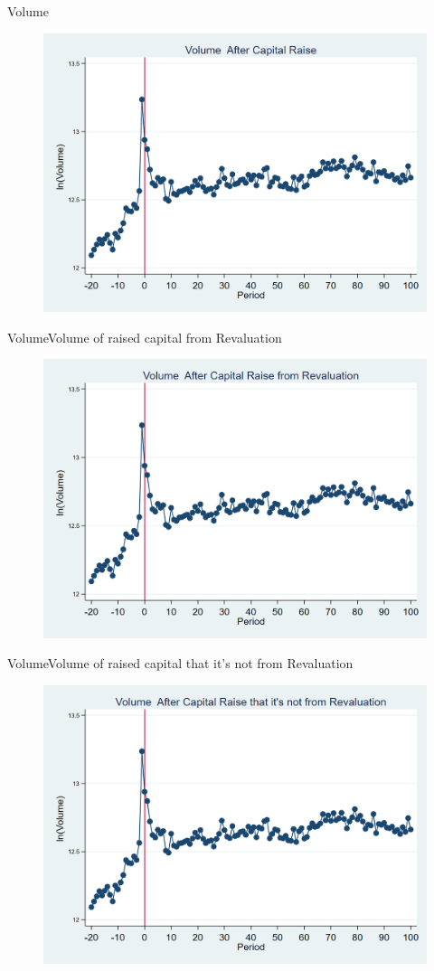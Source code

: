 \documentclass{beamer}
\begin{document}
\begin{frame}{Volume}
\begin{figure}
\centering
\includegraphics[width=0.7\linewidth]{Output/volume.png}
\label{fig:volume}
\end{figure}
\end{frame}


\begin{frame}{Volume}{Volume of raised capital from Revaluation}
\begin{figure}
\centering
\includegraphics[width=0.7\linewidth]{Output/volume_Revaluation.png}
\label{fig:volumerevaluation}
\end{figure}
\end{frame}


\begin{frame}{Volume}{Volume of raised capital that it's not from Revaluation}
\begin{figure}
\centering
\includegraphics[width=0.7\linewidth]{Output/volume_NoRevaluation.png}
\label{fig:volumenorevaluation}
\end{figure}
\end{frame}
\end{document}
